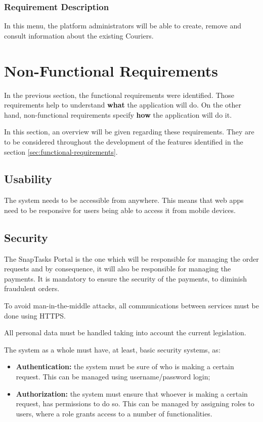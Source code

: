 \subsubsection{Requirement Description}
In this menu, the platform administrators will be able to create, remove and consult information about the existing Couriers.

\section{Non-Functional Requirements}
\label{sec:non-functional-requirements}
In the previous section, the functional requirements were identified. Those requirements help to understand \textbf{what} the application will do. On the other hand, non-functional requirements specify \textbf{how} the application will do it. 
\par
In this section, an overview will be given regarding these requirements. They are to be considered throughout the development of the features identified in the section \ref{sec:functional-requirements}.

\subsection{Usability}
The system needs to be accessible from anywhere. This means that web apps need to be responsive for users being able to access it from mobile devices.

\subsection{Security}

The SnapTasks Portal is the one which will be responsible for managing the order requests and by consequence, it will also be responsible for managing the payments. It is mandatory to ensure the security of the payments, to diminish fraudulent orders. 
\par
To avoid man-in-the-middle attacks, all communications between services must be done using HTTPS.
\par
All personal data must be handled taking into account the current legislation.
\par
The system as a whole must have, at least, basic security systems, as:
\begin{itemize}
    \item \textbf{Authentication:} the system must be sure of who is making a certain request. This can be managed using username/password login;
    \item \textbf{Authorization:} the system must ensure that whoever is making a certain request, has permissions to do so. This can be managed by assigning roles to users, where a role grants access to a number of functionalities.
\end{itemize}


